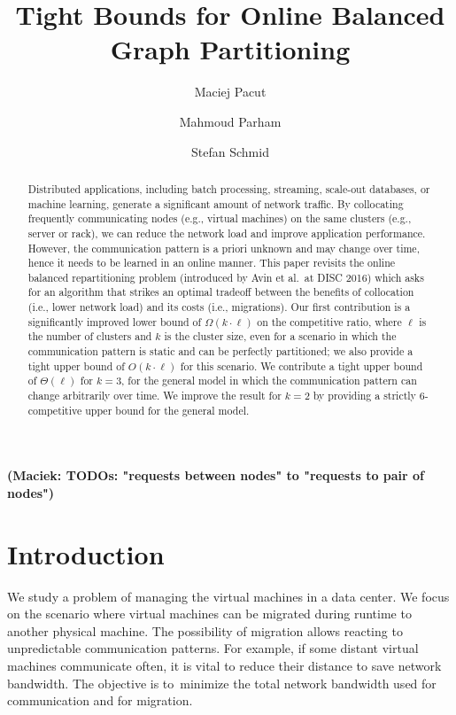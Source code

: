 \documentclass[manuscript,screen=true, review, anonymous]{acmart}
\title{Tight Bounds for Online Balanced Graph Partitioning}
\author{Maciej Pacut}
\affiliation{%
 \institution{Faculty of Computer Science, University of Vienna}
 \country{Austria}
 }
\author{Mahmoud Parham}
\affiliation{%
 \institution{Faculty of Computer Science, University of Vienna}
 \country{Austria}
 }
\author{Stefan Schmid}
\affiliation{%
 \institution{Faculty of Computer Science, University of Vienna}
 \country{Austria}
 }
\newcommand\maciek[1]{\color{brown}\textbf{(Maciek: #1)}\color{black}}
\begin{document}
\begin{abstract}
	Distributed   applications,  including  batch  processing, streaming, scale-out databases,
	or machine learning, generate a significant amount of network traffic.
	By collocating frequently communicating nodes (e.g., virtual machines) on the same clusters (e.g., server or rack), we can reduce the network load and  improve application performance. 
	However, the communication pattern is a priori unknown and may change over time, hence it needs to be learned in an online manner.
	This paper revisits the online 
	balanced repartitioning problem 
	(introduced by Avin et al.~at DISC 2016)
	which asks for an algorithm that strikes
	an optimal tradeoff between the benefits
	of collocation (i.e., lower network load) 
	and its costs (i.e., migrations). 
	Our first contribution is a significantly improved
	lower bound of $\Omega(k\cdot \ell)$ on the
	competitive ratio, where $\ell$ is the number
	of clusters and $k$ is the cluster size,
	even for a scenario in which the communication
	pattern is static and can be perfectly partitioned;
	we also provide a tight upper bound 
	of $O(k\cdot \ell)$ for this scenario.
	We contribute a tight upper bound
	of $\Theta(\ell)$ for $k=3$,
	for the general model in which the
	communication pattern can change arbitrarily
	over time.
	We improve the result for $k=2$ by providing a strictly $6$-competitive upper bound for the general model.
	
\end{abstract}

\maketitle

\renewcommand{\shortauthors}{M.~Pacut, M.~Parham, S.~Schmid}

\maciek{TODOs: "requests between nodes" to "requests to pair of nodes"}

\section{Introduction}

We study a problem of managing the virtual machines in a data center.
We focus on the scenario where virtual machines can be migrated during runtime to another physical machine.
The possibility of migration allows reacting to unpredictable communication patterns.
For example, if some distant virtual machines communicate often, it is vital to reduce their distance to save network bandwidth.
The objective is to~minimize the total network bandwidth used for communication and for migration.
\end{document}
